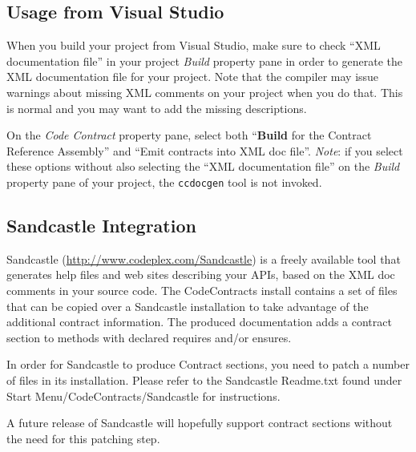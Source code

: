 \documentclass{article}
\newcommand{\code}[1]{\lstinline{#1}}
\begin{document}
\subsection{Usage from Visual Studio}
When you build your project from Visual Studio, make sure to check
``XML documentation file'' in your project \emph{Build} property pane in
order to generate the XML documentation file for your project. Note
that the compiler may issue warnings about missing XML comments on
your project when you do that. This is normal and you may want to add
the missing descriptions.

On the \emph{Code Contract} property pane, select both
``\textbf{Build} for the Contract
Reference Assembly'' and ``Emit contracts into XML doc
file''. \emph{Note}: if you select these options without also selecting the
``XML documentation file'' on the \emph{Build} property pane of your
project, the \code{ccdocgen} tool is not invoked.

\subsection{Sandcastle Integration}

Sandcastle (\url{http://www.codeplex.com/Sandcastle}) is a freely
available tool that generates help files and web sites describing your
APIs, based on the XML doc comments in your source code. The
CodeContracts install contains a set of files that can be copied over
a Sandcastle installation to take advantage of the additional contract
information. The produced documentation adds a contract section to
methods with declared requires and/or ensures.

In order for Sandcastle to produce Contract sections, you need to
patch a number of files in its installation. Please refer to the
Sandcastle Readme.txt found under Start Menu/CodeContracts/Sandcastle
for instructions.

A future release of Sandcastle will hopefully support contract
sections without the need for this patching step.
\end{document}
